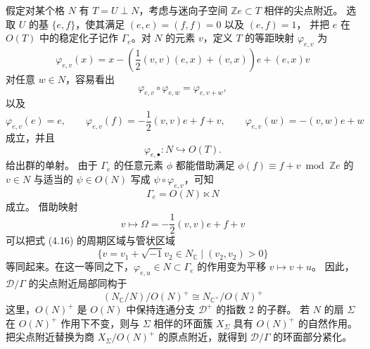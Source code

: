 假定对某个格 $N$ 有 $T=U\perp N$，考虑与迷向子空间 $\mathbb{Z}e\subset T$ 相伴的尖点附近。
选取 $U$ 的基 $\{e,f\}$，使其满足 $(e,e)=(f,f)=0$ 以及 $(e,f)=1$，
并把 $e$ 在 $O(T)$ 中的稳定化子记作 $\Gamma_{e}$。对 $N$ 的元素 $v$，定义 $T$ 的等距映射 $\varphi_{e,v}$ 为
\begin{equation}
  \varphi_{e,v}(x)=x-\left(\frac{1}{2}(v,v)(e,x)+(v,x)\right)e+(e,x)v \tag{4.22}
\end{equation}
对任意 $w\in N$，容易看出
\begin{equation}
  \varphi_{e,v}\circ\varphi_{e,w}=\varphi_{e,v+w}, \tag{4.23}
\end{equation}
以及
\begin{equation}
  \varphi_{e,v}(e)=e,\qquad\varphi_{e,v}(f)=-\frac{1}{2}(v,v)e+f+v,\qquad
  \varphi_{e,v}(w)=-(v,w)e+w \tag{4.24}
\end{equation}
成立，并且
\begin{equation}
  \varphi_{e,\bullet}\colon N\hookrightarrow O(T). \tag{4.25}
\end{equation}
给出群的单射。
由于 $\Gamma_{e}$ 的任意元素 $\phi$ 都能借助满足 $\phi(f)\equiv f+v\bmod\mathbb{Z}e$ 的 $v\in N$
与适当的 $\psi\in O(N)$ 写成 $\psi\circ\varphi_{e,v}$，可知
\begin{equation}
  \Gamma_{e}=O(N)\ltimes N \tag{4.26}
\end{equation}
成立。
借助映射
\begin{equation}
  v\mapsto\Omega=-\frac{1}{2}(v,v)e+f+v \tag{4.27}
\end{equation}
可以把式 (4.16) 的周期区域与管状区域
\begin{equation}
  \{v=v_{1}+\sqrt{-1}v_{2}\in N_{\mathbb{C}}\mid(v_{2},v_{2})>0\} \tag{4.28}
\end{equation}
等同起来。在这一等同之下，$\varphi_{e,u}\in N\subset\Gamma_{e}$ 的作用变为平移 $v\mapsto v+u$。
因此，$\mathcal{D}/\Gamma$ 的尖点附近局部同构于
\begin{equation}
  (N_{\mathbb{C}}/N)/O(N)^{+}\cong N_{\mathbb{C}^{\times}}/O(N)^{+} \tag{4.29}
\end{equation}
这里，$O(N)^{+}$ 是 $O(N)$ 中保持连通分支 $\mathcal{D}^{+}$ 的指数 2 的子群。
若 $N$ 的扇 $\Sigma$ 在 $O(N)^{+}$ 作用下不变，则与 $\Sigma$ 相伴的环面簇 $X_{\Sigma}$ 具有 $O(N)^{+}$ 的自然作用。
把尖点附近替换为商 $X_{\Sigma}/O(N)^{+}$ 的原点附近，就得到 $\mathcal{D}/\Gamma$ 的环面部分紧化。

